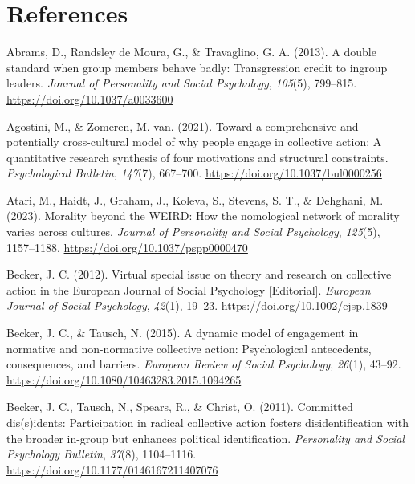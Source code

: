 \documentclass[12pt, letterpaper]{article}
\newcommand{\refsection}{\newpage \section{References}}
\newenvironment{CSLReferences}[2]{}{}
\begin{document}
\refsection

\begingroup

\noindent \setlength{\parindent}{-0.5in} \setlength{\leftskip}{0.5in}
\small

\hypertarget{refs}{}
\begin{CSLReferences}{1}{0}
\leavevmode{}%
Abrams, D., Randsley de Moura, G., \& Travaglino, G. A. (2013). A double
standard when group members behave badly: {Transgression} credit to
ingroup leaders. \emph{Journal of Personality and Social Psychology},
\emph{105}(5), 799--815. \url{https://doi.org/10.1037/a0033600}

\leavevmode{}%
Agostini, M., \& Zomeren, M. van. (2021). Toward a comprehensive and
potentially cross-cultural model of why people engage in collective
action: {A} quantitative research synthesis of four motivations and
structural constraints. \emph{Psychological Bulletin}, \emph{147}(7),
667--700. \url{https://doi.org/10.1037/bul0000256}

\leavevmode{}%
Atari, M., Haidt, J., Graham, J., Koleva, S., Stevens, S. T., \&
Dehghani, M. (2023). Morality beyond the {WEIRD}: {How} the nomological
network of morality varies across cultures. \emph{Journal of Personality
and Social Psychology}, \emph{125}(5), 1157--1188.
\url{https://doi.org/10.1037/pspp0000470}

\leavevmode{}%
Becker, J. C. (2012). Virtual special issue on theory and research on
collective action in the {European} {Journal} of {Social} {Psychology}
{[}{Editorial}{]}. \emph{European Journal of Social Psychology},
\emph{42}(1), 19--23. \url{https://doi.org/10.1002/ejsp.1839}

\leavevmode{}%
Becker, J. C., \& Tausch, N. (2015). A dynamic model of engagement in
normative and non-normative collective action: {Psychological}
antecedents, consequences, and barriers. \emph{European Review of Social
Psychology}, \emph{26}(1), 43--92.
\url{https://doi.org/10.1080/10463283.2015.1094265}

\leavevmode{}%
Becker, J. C., Tausch, N., Spears, R., \& Christ, O. (2011). Committed
dis(s)idents: {Participation} in radical collective action fosters
disidentification with the broader in-group but enhances political
identification. \emph{Personality and Social Psychology Bulletin},
\emph{37}(8), 1104--1116. \url{https://doi.org/10.1177/0146167211407076}


\end{CSLReferences}
\end{document}
